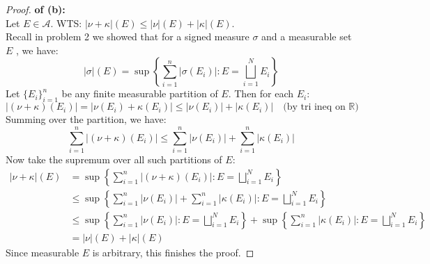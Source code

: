 \documentclass[lang=cn,11pt]{elegantbook}
\begin{document}
\begin{proof}
    \textbf{of (b):} \\
Let $E\in \mathcal{A}$. WTS: $|\nu+\kappa|(E) \le |\nu|(E)+|\kappa|(E) $.\\
Recall in problem 2 we showed that for a signed measure \(\sigma\) and a measurable set \(E\) , we have:
\[
|\sigma|(E) = \sup \left\{ \sum_{i=1}^n |\sigma(E_i)| :E= \bigsqcup_{i=1}^N E_i\right\}
\]
Let \(\{E_i\}_{i=1}^n\) be any finite measurable partition of \(E\). Then for each $E_i$:
\[
|(\nu + \kappa)(E_i)| = |\nu(E_i) + \kappa(E_i)| \le |\nu(E_i)| + |\kappa(E_i)|
\quad \text{(by tri ineq on \(\mathbb{R}\))}
\]
Summing over the partition, we have:\[
\sum_{i=1}^n |(\nu + \kappa)(E_i)| \le \sum_{i=1}^n |\nu(E_i)| + \sum_{i=1}^n |\kappa(E_i)|
\]
Now take the supremum over all such partitions of \(E\):
\begin{align*}
    |\nu + \kappa|(E) &=\sup \left\{ \sum_{i=1}^n |(\nu + \kappa)(E_i)|
 : E= \bigsqcup_{i=1}^N E_i \right\} \\
    & \leq \sup \left\{ \sum_{i=1}^n |\nu(E_i)| +  \sum_{i=1}^n |\kappa(E_i)|
 : E= \bigsqcup_{i=1}^N E_i \right\}\\
 &\leq \sup \left\{ \sum_{i=1}^n |\nu(E_i)| 
 : E= \bigsqcup_{i=1}^N E_i \right\} + \sup \left\{ \sum_{i=1}^n |\kappa(E_i)|
 : E= \bigsqcup_{i=1}^N E_i \right\}\\
 &= |\nu|(E)+|\kappa|(E) 
\end{align*}
Since measurable $E$ is arbitrary, this finishes the proof.
\end{proof}
\end{document}
